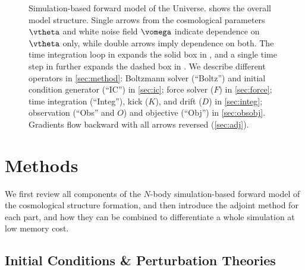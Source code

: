 \documentclass[modern, trackchanges, dvipsnames]{aastex631}
\newcommand{\half}{\nicefrac12}
\begin{document}
\begin{figure}[t]
{
}
\caption{Simulation-based forward model of the Universe.
 shows the overall model structure.
Single arrows from the cosmological parameters $\vtheta$ and white noise
field $\vomega$ indicate dependence on $\vtheta$ only, while double
arrows imply dependence on both.
The time integration loop in  expands the solid box in
, and a single time step in  further
expands the dashed box in .
We describe different operators in \autoref{sec:method}: Boltzmann
solver (``Boltz'') and initial condition generator (``IC'') in
\autoref{sec:ic}; force solver ($F$) in \autoref{sec:force}; time
integration (``Integ''), kick ($K$), and drift ($D$) in
\autoref{sec:integ}; observation (``Obs'' and $O$) and objective
(``Obj'') in \autoref{sec:obsobj}.
Gradients flow backward with all arrows reversed (\autoref{sec:adj}).
}
\end{figure}


\vspace{1em}
\section{Methods}
\label{sec:method}

We first review all components of the $N$-body simulation-based forward
model of the cosmological structure formation, and then introduce the
adjoint method for each part, and how they can be combined to
differentiate a whole simulation at low memory cost.


\vspace{1em}
\subsection{Initial Conditions \& Perturbation Theories}
\label{sec:ic}
\end{document}
